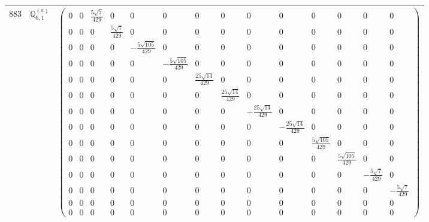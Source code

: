\documentclass[fleqn,8pt,landscape]{jsarticle}
\begin{document}
\begin{center}
\begin{longtable}{ccc}
$ 883 $ & $ \mathbb{Q}_{6,1}^{(a)} $ & $ \begin{pmatrix} 0 & 0 & \frac{5 \sqrt{7}}{429} & 0 & 0 & 0 & 0 & 0 & 0 & 0 & 0 & 0 & 0 & 0 \\ 0 & 0 & 0 & \frac{5 \sqrt{7}}{429} & 0 & 0 & 0 & 0 & 0 & 0 & 0 & 0 & 0 & 0 \\ 0 & 0 & 0 & 0 & - \frac{5 \sqrt{105}}{429} & 0 & 0 & 0 & 0 & 0 & 0 & 0 & 0 & 0 \\ 0 & 0 & 0 & 0 & 0 & - \frac{5 \sqrt{105}}{429} & 0 & 0 & 0 & 0 & 0 & 0 & 0 & 0 \\ 0 & 0 & 0 & 0 & 0 & 0 & \frac{25 \sqrt{14}}{429} & 0 & 0 & 0 & 0 & 0 & 0 & 0 \\ 0 & 0 & 0 & 0 & 0 & 0 & 0 & \frac{25 \sqrt{14}}{429} & 0 & 0 & 0 & 0 & 0 & 0 \\ 0 & 0 & 0 & 0 & 0 & 0 & 0 & 0 & - \frac{25 \sqrt{14}}{429} & 0 & 0 & 0 & 0 & 0 \\ 0 & 0 & 0 & 0 & 0 & 0 & 0 & 0 & 0 & - \frac{25 \sqrt{14}}{429} & 0 & 0 & 0 & 0 \\ 0 & 0 & 0 & 0 & 0 & 0 & 0 & 0 & 0 & 0 & \frac{5 \sqrt{105}}{429} & 0 & 0 & 0 \\ 0 & 0 & 0 & 0 & 0 & 0 & 0 & 0 & 0 & 0 & 0 & \frac{5 \sqrt{105}}{429} & 0 & 0 \\ 0 & 0 & 0 & 0 & 0 & 0 & 0 & 0 & 0 & 0 & 0 & 0 & - \frac{5 \sqrt{7}}{429} & 0 \\ 0 & 0 & 0 & 0 & 0 & 0 & 0 & 0 & 0 & 0 & 0 & 0 & 0 & - \frac{5 \sqrt{7}}{429} \\ 0 & 0 & 0 & 0 & 0 & 0 & 0 & 0 & 0 & 0 & 0 & 0 & 0 & 0 \\ 0 & 0 & 0 & 0 & 0 & 0 & 0 & 0 & 0 & 0 & 0 & 0 & 0 & 0 \end{pmatrix} $ \\ \hline

\end{longtable}
\end{center}
\end{document}
